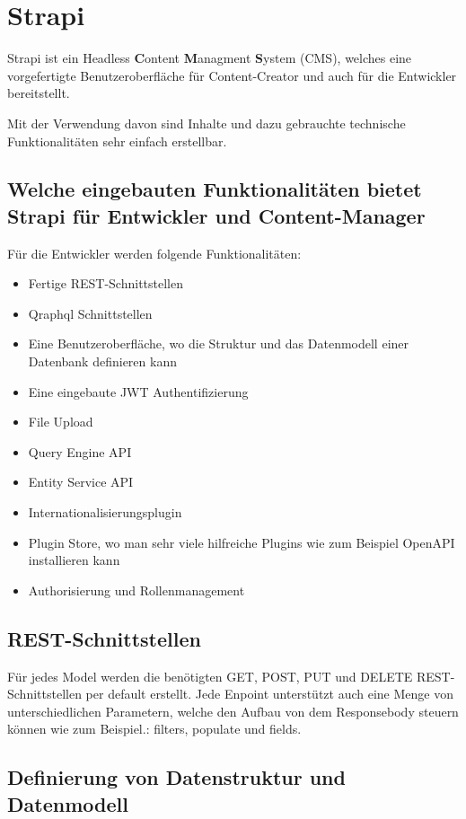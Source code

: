 \section{Strapi}
Strapi ist ein Headless \textbf{C}ontent \textbf{M}anagment \textbf{S}ystem (CMS),
welches eine vorgefertigte Benutzeroberfläche für Content-Creator
und auch für die Entwickler bereitstellt.

Mit der Verwendung davon sind Inhalte und dazu gebrauchte technische Funktionalitäten
sehr einfach erstellbar.
\cite{strapi-vs-wordpress}


\subsection*{Welche eingebauten Funktionalitäten bietet Strapi für Entwickler und Content-Manager}


Für die Entwickler werden folgende Funktionalitäten:

\begin{itemize}
  \item Fertige REST-Schnittstellen
  \item Qraphql Schnittstellen
  \item Eine Benutzeroberfläche, wo die Struktur und das Datenmodell einer Datenbank definieren kann
  \item Eine eingebaute JWT Authentifizierung
  \item File Upload
  \item Query Engine API
  \item Entity Service API
  \item Internationalisierungsplugin
  \item Plugin Store, wo man sehr viele hilfreiche Plugins wie zum Beispiel OpenAPI installieren kann
  \item Authorisierung und Rollenmanagement
\end{itemize}

\subsection{REST-Schnittstellen}
\label{subsec:rest}
Für jedes Model werden die benötigten GET, POST, PUT und DELETE REST-Schnittstellen per default erstellt.
Jede Enpoint unterstützt auch eine Menge von unterschiedlichen Parametern, welche den Aufbau von dem Responsebody steuern können wie zum Beispiel.: filters, populate  und fields.
\cite{rest-query-parameters}
\subsection{Definierung von Datenstruktur und Datenmodell}

